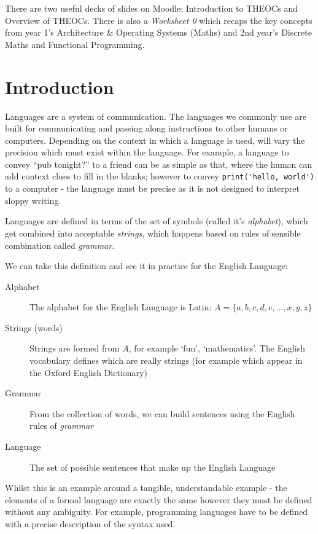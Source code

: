 
\begin{extlink}
There are two useful decks of slides on Moodle: Introduction to THEOCs and Overview of THEOCs. There is also a \textit{Worksheet 0} which recaps the key concepts from year 1's Architecture \& Operating Systems (Maths) and 2nd year's Discrete Maths and Functional Programming. 
\end{extlink}

\section{Introduction}

Languages are a system of communication. The languages we commonly use are built for communicating and passing along instructions to other humans or computers. Depending on the context in which a language is used, will vary the precision which must exist within the language. For example, a language to convey ``pub tonight?'' to a friend can be as simple as that, where the human can add context clues to fill in the blanks; however to convey \verb|print('hello, world')| to a computer - the language must be precise as it is not designed to interpret sloppy writing.

Languages are defined in terms of the set of symbols (called it's \textit{alphabet}), which get combined into acceptable \textit{strings}, which happens based on rules of sensible combination called \textit{grammar}. 

We can take this definition and see it in practice for the English Language:

\begin{description}
    \item[Alphabet] The alphabet for the English Language is Latin: $A = \{a, b, c, d, e, \ldots, x, y, z\}$
    \item[Strings (words)] Strings are formed from $A$, for example `fun', `mathematics'. The English vocabulary defines which are really strings (for example which appear in the Oxford English Dictionary)
    \item[Grammar] From the collection of words, we can build sentences using the English rules of \textit{grammar}
    \item[Language] The set of possible sentences that make up the English Language 
\end{description}

Whilst this is an example around a tangible, understandable example - the elements of a formal language are exactly the same however they must be defined without any ambiguity. For example, programming languages have to be defined with a precise description of the syntax used.


